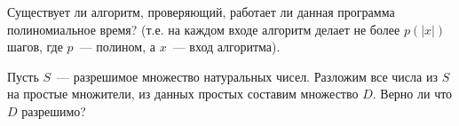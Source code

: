 \begin{ptask}{10}
    Существует ли алгоритм, проверяющий, работает ли данная программа
    полиномиальное время? (т.е. на каждом входе алгоритм делает не более $p(|x|)$
    шагов, где $p$~--- полином, а $x$~--- вход алгоритма).
\end{ptask}

\begin{ptask}{15}
    Пусть $S$~--- разрешимое множество натуральных чисел. Разложим все
    числа из $S$ на простые множители, из данных простых составим
    множество $D$. Верно ли что $D$ разрешимо?
\end{ptask}
